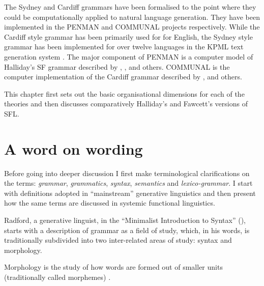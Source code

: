 The Sydney and Cardiff grammars have been formalised to the point where they could be computationally applied to natural language generation. They have been implemented in the PENMAN \citep{PenmanOverview,Penman89} and COMMUNAL \citep{Fawcett90-communal} projects respectively. While the Cardiff style grammar has been primarily used for for English, the Sydney style grammar has been implemented for over twelve languages in the KPML text generation system \citep{KPML1,Bateman96-KPML-resources,Bateman1997}. The major component of PENMAN is a computer model of Halliday's SF grammar described by \citet{gazebo}, \citet{MatthiessenBateman91}, \citet{Matthiessen-lexcartog-book} and others. COMMUNAL is the computer implementation of the Cardiff grammar described by \citet{Fawcett:1988}, \citet{Fawcett93-ewnlg4} and others. 

This chapter first sets out the basic organisational dimensions for each of the theories and then discusses comparatively Halliday's \citep{Halliday2002} and Fawcett's \citep{Fawcett2000} versions of SFL.


\section{A word on wording}
\label{sec:wording}
Before going into deeper discussion I first make terminological clarifications on the terms: \textit{grammar}, \textit{grammatics}, \textit{syntax}, \textit{semantics} and \textit{lexico-grammar}. I start with definitions adopted in ``mainstream'' generative linguistics and then present how the same terms are discussed in systemic functional linguistics.

Radford, a generative linguist, in the ``Minimalist Introduction to Syntax'' (\citeyear{Radford1997}), starts with a description of grammar as a field of study, which, in his words, is traditionally subdivided into two inter-related areas of study: syntax and morphology. %

\begin{definition}\label{def:morphology-min}
Morphology is the study of how words are formed out of smaller units (traditionally called morphemes) \citep[1]{Radford1997}.
\end{definition}

